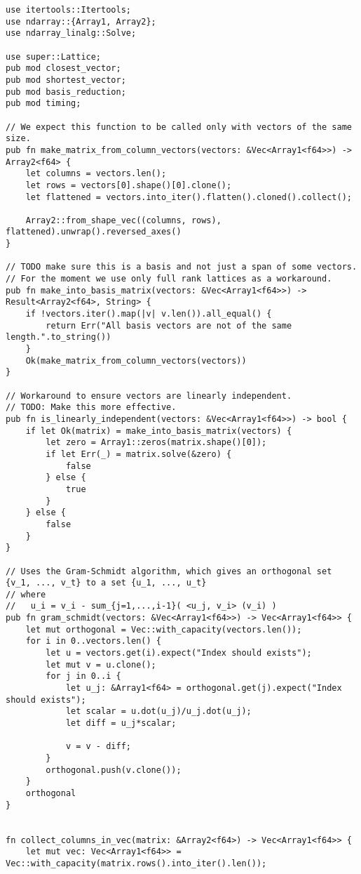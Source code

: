 \begin{verbatim}
use itertools::Itertools;
use ndarray::{Array1, Array2};
use ndarray_linalg::Solve;

use super::Lattice;
pub mod closest_vector;
pub mod shortest_vector;
pub mod basis_reduction;
pub mod timing;

// We expect this function to be called only with vectors of the same size.
pub fn make_matrix_from_column_vectors(vectors: &Vec<Array1<f64>>) -> Array2<f64> {
    let columns = vectors.len();
    let rows = vectors[0].shape()[0].clone();
    let flattened = vectors.into_iter().flatten().cloned().collect();

    Array2::from_shape_vec((columns, rows), flattened).unwrap().reversed_axes()
}

// TODO make sure this is a basis and not just a span of some vectors.
// For the moment we use only full rank lattices as a workaround.
pub fn make_into_basis_matrix(vectors: &Vec<Array1<f64>>) -> Result<Array2<f64>, String> {
    if !vectors.iter().map(|v| v.len()).all_equal() {
        return Err("All basis vectors are not of the same length.".to_string())
    }
    Ok(make_matrix_from_column_vectors(vectors))
}

// Workaround to ensure vectors are linearly independent.
// TODO: Make this more effective.
pub fn is_linearly_independent(vectors: &Vec<Array1<f64>>) -> bool {
    if let Ok(matrix) = make_into_basis_matrix(vectors) {
        let zero = Array1::zeros(matrix.shape()[0]);
        if let Err(_) = matrix.solve(&zero) {
            false
        } else {
            true
        }
    } else {
        false
    }
}

// Uses the Gram-Schmidt algorithm, which gives an orthogonal set {v_1, ..., v_t} to a set {u_1, ..., u_t}
// where
//   u_i = v_i - sum_{j=1,...,i-1}( <u_j, v_i> (v_i) )
pub fn gram_schmidt(vectors: &Vec<Array1<f64>>) -> Vec<Array1<f64>> {
    let mut orthogonal = Vec::with_capacity(vectors.len());
    for i in 0..vectors.len() {
        let u = vectors.get(i).expect("Index should exists");
        let mut v = u.clone();
        for j in 0..i {
            let u_j: &Array1<f64> = orthogonal.get(j).expect("Index should exists");
            let scalar = u.dot(u_j)/u_j.dot(u_j);
            let diff = u_j*scalar;

            v = v - diff;
        }
        orthogonal.push(v.clone());
    }
    orthogonal
}


fn collect_columns_in_vec(matrix: &Array2<f64>) -> Vec<Array1<f64>> {
    let mut vec: Vec<Array1<f64>> = Vec::with_capacity(matrix.rows().into_iter().len());
    

\end{verbatim}
